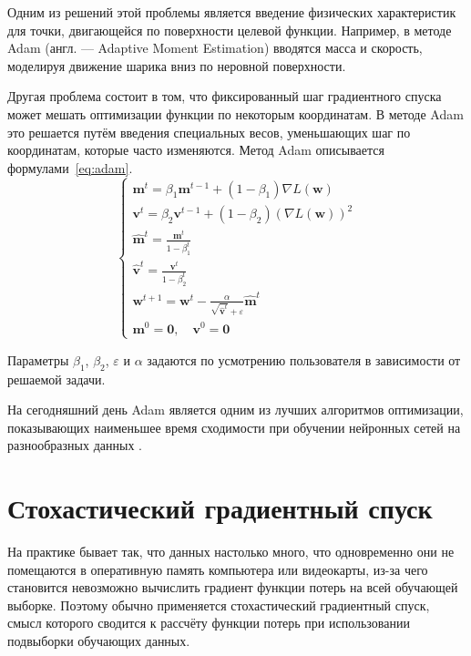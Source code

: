 Одним из решений этой проблемы является введение физических характеристик для точки, двигающейся по поверхности целевой функции. Например, в методе Adam (англ. --- Adaptive Moment Estimation) вводятся масса и скорость, моделируя движение шарика вниз по неровной поверхности.

Другая проблема состоит в том, что фиксированный шаг градиентного спуска может мешать оптимизации функции по некоторым координатам. В методе Adam это решается путём введения специальных весов, уменьшающих шаг по координатам, которые часто изменяются. Метод Adam описывается формулами \ref*{eq:adam}.
\begin{equation}
    \label{eq:adam}
    \begin{cases}
        \mathbf{m}^t=\beta_1\mathbf{m}^{t-1}+(1-\beta_1)\nabla L(\mathbf{w}) \\
        \mathbf{v}^t=\beta_2\mathbf{v}^{t-1}+(1-\beta_2)(\nabla L(\mathbf{w}))^2 \\
        \hat{\mathbf{m}}^t=\frac{\mathbf{m}^t}{1-\beta_1^t} \\
        \hat{\mathbf{v}}^t=\frac{\mathbf{v}^t}{1-\beta_2^t} \\
        \mathbf{w}^{t+1}=\mathbf{w}^t-\frac{\alpha}{\sqrt{\hat{\mathbf{v}}^t}+\varepsilon}\hat{\mathbf{m}}^t \\
        \mathbf{m}^0=\mathbf{0},\quad\mathbf{v}^0=\mathbf{0}
    \end{cases}
\end{equation}

Параметры $\beta_1$, $\beta_2$, $\varepsilon$ и $\alpha$ задаются по усмотрению пользователя в зависимости от решаемой задачи.

На сегодняшний день Adam является одним из лучших алгоритмов оптимизации, показывающих наименьшее время сходимости при обучении нейронных сетей на разнообразных данных \cite{art:optimizers}.

\section{Стохастический градиентный спуск}

На практике бывает так, что данных настолько много, что одновременно они не помещаются в оперативную память компьютера или видеокарты, из-за чего становится невозможно вычислить градиент функции потерь на всей обучающей выборке. Поэтому обычно применяется стохастический градиентный спуск, смысл которого сводится к рассчёту функции потерь при использовании подвыборки обучающих данных.

